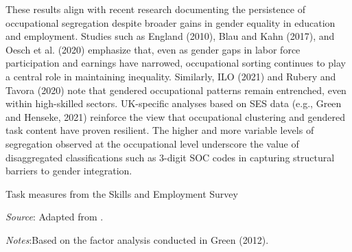 These results align with recent research documenting the persistence of occupational segregation despite 
broader gains in gender equality in education and employment. Studies such as England (2010), Blau and Kahn (2017), 
and Oesch et al. (2020) emphasize that, even as gender gaps in labor force participation and earnings have narrowed, 
occupational sorting continues to play a central role in maintaining inequality. Similarly, ILO (2021) and 
Rubery and Tavora (2020) note that gendered occupational patterns remain entrenched, even within high-skilled sectors. 
UK-specific analyses based on SES data (e.g., Green and Henseke, 2021) reinforce the view that occupational clustering 
and gendered task content have proven resilient. The higher and more variable levels of segregation observed at the 
occupational level underscore the value of disaggregated classifications such as 3-digit SOC codes in capturing 
structural barriers to gender integration.


\begin{table}[!t]
    \centering
    \caption{Task measures from the Skills and Employment Survey}
    \label{tab:task-ses}
    \begin{threeparttable}
        
        \begin{tablenotes}[flushleft]
            \scriptsize{\item \textit{Source}: Adapted from \textcite{lindleyGenderDifferencesJob2015a}. 
            \item \textit{Notes}:Based on the factor analysis conducted in Green (2012).}
        \end{tablenotes}
    \end{threeparttable}
\end{table}






            

